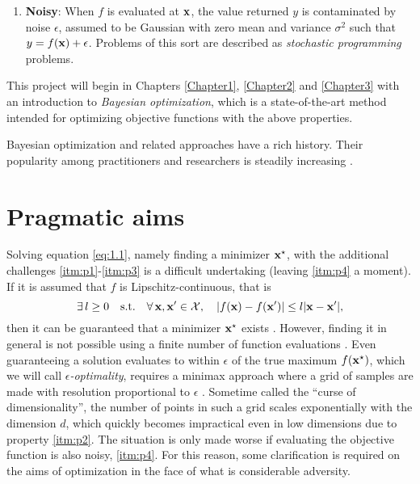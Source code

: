 \begin{enumerate}[label={P}{\arabic*}]
{}
\item{ \label{itm:p4}
\textbf{Noisy}: When $f$ is evaluated at $\mathbf{x}$, the value returned $y$ is contaminated by noise $\epsilon$, assumed to be Gaussian with zero mean and variance $\sigma^2$ such that $y = f(\mathbf{x}) + \epsilon$. Problems of this sort are described as \textit{stochastic programming} problems.
}
\end{enumerate}

This project will begin in Chapters \ref{Chapter1}, \ref{Chapter2} and \ref{Chapter3} with an introduction to \textit{Bayesian optimization}, which is a state-of-the-art method intended for optimizing objective functions with the above properties. 

Bayesian optimization and related approaches have a rich history. Their popularity among practitioners and researchers is steadily increasing \cite{shahriari2016taking}. 

\newpage

\section{Pragmatic aims} \label{sec:prag}

Solving equation \ref{eq:1.1}, namely finding a minimizer $\mathbf{x}^\star$, with the additional challenges \ref{itm:p1}-\ref{itm:p3} is a difficult undertaking (leaving \ref{itm:p4} a moment). If it is assumed that $f$ is Lipschitz-continuous, that is
%
\begin{equation}
\nonumber \exists \, l \geq 0 \quad\mathrm{s.t.}\quad \forall \, \mathbf{x}, \mathbf{x}' \in \mathcal{X}, \quad \lvert f(\mathbf{x}) - f(\mathbf{x}') \rvert \leq l \lvert \mathbf{x} - \mathbf{x}' \rvert,
\end{equation}
%
then it can be guaranteed that a minimizer $\mathbf{x}^\star$ exists \citep{horst2013handbook}. However, finding it in general is not possible using a finite number of function evaluations \citep{lizotte}. Even guaranteeing a solution evaluates to within $\epsilon$ of the true maximum $f(\mathbf{x}^\star)$, which we will call \textit{$\epsilon$-optimality}, requires a minimax approach where a grid of samples are made with resolution proportional to $\epsilon$ \citep{betro1991}. Sometime called the ``curse of dimensionality'', the number of points in such a grid scales exponentially with the dimension $d$, which quickly becomes impractical even in low dimensions due to property \ref{itm:p2}. The situation is only made worse if evaluating the objective function is also noisy, \ref{itm:p4}. For this reason, some clarification is required on the aims of optimization in the face of what is considerable adversity. 

